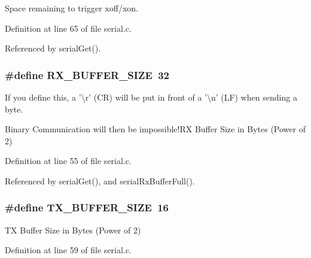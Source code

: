 Space remaining to trigger xoff/xon. 



Definition at line 65 of file serial.\-c.



Referenced by serial\-Get().

\hypertarget{group__uart_ga739a2a1a0047c98ac1b18ecd25dac092}{
\subsubsection[{R\-X\-\_\-\-B\-U\-F\-F\-E\-R\-\_\-\-S\-I\-Z\-E}]{\setlength{\rightskip}{0pt plus 5cm}\#define R\-X\-\_\-\-B\-U\-F\-F\-E\-R\-\_\-\-S\-I\-Z\-E~32}}\label{group__uart_ga739a2a1a0047c98ac1b18ecd25dac092}


If you define this, a '\textbackslash{}r' (C\-R) will be put in front of a '\textbackslash{}n' (L\-F) when sending a byte. 

Binary Communication will then be impossible!\-R\-X Buffer Size in Bytes (Power of 2) 

Definition at line 55 of file serial.\-c.



Referenced by serial\-Get(), and serial\-Rx\-Buffer\-Full().

\hypertarget{group__uart_ga9ab33647617098646990fe263600b650}{
\subsubsection[{T\-X\-\_\-\-B\-U\-F\-F\-E\-R\-\_\-\-S\-I\-Z\-E}]{\setlength{\rightskip}{0pt plus 5cm}\#define T\-X\-\_\-\-B\-U\-F\-F\-E\-R\-\_\-\-S\-I\-Z\-E~16}}\label{group__uart_ga9ab33647617098646990fe263600b650}


T\-X Buffer Size in Bytes (Power of 2) 



Definition at line 59 of file serial.\-c.



